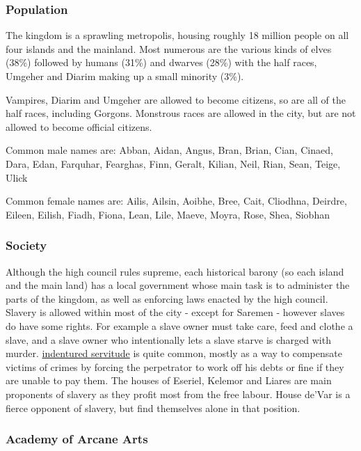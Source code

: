 \subsubsection{Population}

The kingdom is a sprawling metropolis, housing roughly 18 million people on
all four islands and the mainland. Most numerous are the various kinds of
elves (38\%) followed by humans (31\%) and dwarves (28\%) with the half
races, Umgeher and Diarim making up a small minority (3\%).

Vampires, Diarim and Umgeher are allowed to become citizens, so are all of the
half races, including Gorgons. Monstrous races are allowed in the city, but
are not allowed to become official citizens.

Common male names are: Abban, Aidan, Angus, Bran, Brian, Cian, Cinaed, Dara,
Edan, Farquhar, Fearghas, Finn, Geralt, Kilian, Neil, Rian, Sean, Teige, Ulick

Common female names are: Ailis, Ailsin, Aoibhe, Bree, Cait, Cliodhna, Deirdre,
Eileen, Eilish, Fiadh, Fiona, Lean, Lile, Maeve, Moyra, Rose, Shea, Siobhan

\subsubsection{Society}

Although the high council rules supreme, each historical barony (so each
island and the main land) has a local government whose main task is to
administer the parts of the kingdom, as well as enforcing laws enacted by the
high council. Slavery is allowed within most of the city - except for Saremen
- however slaves do have some rights. For example a slave owner must take
care, feed and clothe a slave, and a slave owner who intentionally lets a
slave starve is charged with murder. \hyperref[sec:Indentured
  Servitude]{indentured servitude} is quite common, mostly as a way to
compensate victims of crimes by forcing the perpetrator to work off his debts
or fine if they are unable to pay them. The houses of Eseriel, Kelemor and
Liares are main proponents of slavery as they profit most from the free
labour. House de'Var is a fierce opponent of slavery, but find themselves
alone in that position.

\subsubsection{Academy of Arcane Arts}
\label{sec:Academy of Arcane Arts}

